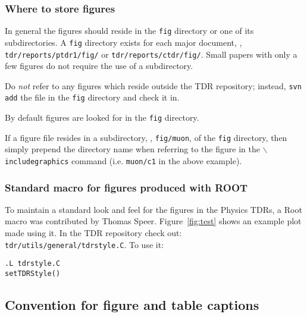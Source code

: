\subsubsection{Where to store figures}

In general the figures should reside in the \texttt{fig} directory or one
of its subdirectories.
A \texttt{fig} directory exists for each major document, \eg,
\texttt{tdr/reports/ptdr1/fig/} or \linebreak[3]\texttt{tdr/reports/ctdr/fig/}. Small papers with only a few figures do not
require the use of a subdirectory.

Do \emph{not} refer to any figures which reside outside the
TDR repository; instead, \texttt{svn add} the file in the \texttt{fig}
directory and check it in.

By default figures are looked for in the \texttt{fig} directory.

If a figure file resides in a subdirectory, \eg, \texttt{fig/muon},
of the \texttt{fig} directory, then simply prepend the directory
name when referring to the figure in the
\texttt{$\backslash${}includegraphics} command (i.e. \texttt{muon/c1} in the
above example).



\subsubsection{Standard macro for figures produced with ROOT \label{sec:root}}

To maintain a standard look and feel for the figures in the Physics
TDRs, a Root macro was
contributed by Thomas Speer. Figure~\ref{fig:test} shows an example
plot made using it. In the TDR repository check out:
\texttt{tdr/utils/general/tdrstyle.C}. To use it:
%
\begin{verbatim}
.L tdrstyle.C
setTDRStyle()
\end{verbatim}

\subsection{Convention for figure and table captions}

